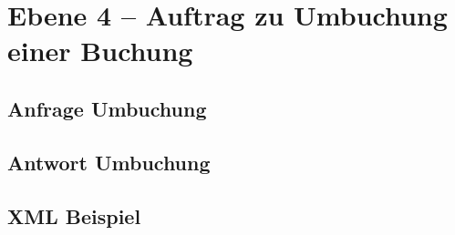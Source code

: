 \section{Ebene 4 -- Auftrag zu Umbuchung einer Buchung}



\subsection{Anfrage Umbuchung}



\subsection{Antwort Umbuchung}



\subsection{XML Beispiel}
